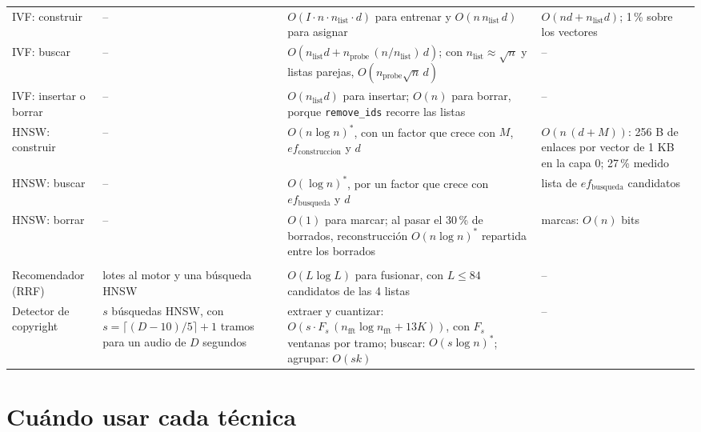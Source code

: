 \documentclass[11pt,a4paper]{article}
\begin{document}
{\begin{longtable}{>{\raggedright\arraybackslash}p{3.1cm}>{\raggedright\arraybackslash}p{4.5cm}>{\raggedright\arraybackslash}p{4.3cm}>{\raggedright\arraybackslash}p{2.9cm}}
IVF: construir & -- & $O(I \cdot n \cdot n_{\text{list}} \cdot d)$ para entrenar y $O(n\, n_{\text{list}}\, d)$ para asignar & $O(n d + n_{\text{list}} d)$; 1\,\% sobre los vectores \\
IVF: buscar & -- & $O(n_{\text{list}} d + n_{\text{probe}}\,(n / n_{\text{list}})\,d)$; con $n_{\text{list}} \approx \sqrt{n}$ y listas parejas, $O(n_{\text{probe}} \sqrt{n}\, d)$ & -- \\
IVF: insertar o borrar & -- & $O(n_{\text{list}} d)$ para insertar; $O(n)$ para borrar, porque \texttt{remove\_ids} recorre las listas & -- \\
HNSW: construir & -- & $O(n \log n)^\ast$, con un factor que crece con $M$, $ef_{\text{construccion}}$ y $d$ & $O(n\,(d + M))$: 256 B de enlaces por vector de 1 KB en la capa 0; 27\,\% medido \\
HNSW: buscar & -- & $O(\log n)^\ast$, por un factor que crece con $ef_{\text{busqueda}}$ y $d$ & lista de $ef_{\text{busqueda}}$ candidatos \\
HNSW: borrar & -- & $O(1)$ para marcar; al pasar el 30\,\% de borrados, reconstrucción $O(n \log n)^\ast$ repartida entre los borrados & marcas: $O(n)$ bits \\
\midrule
\multicolumn{4}{l}{\emph{Parte 5: aplicaciones}} \\
Recomendador (RRF) & 3 lotes al motor y una búsqueda HNSW & $O(L \log L)$ para fusionar, con $L \le 84$ candidatos de las 4 listas & -- \\
Detector de copyright & $s$ búsquedas HNSW, con $s = \lceil (D - 10)/5 \rceil + 1$ tramos para un audio de $D$ segundos & extraer y cuantizar: $O(s \cdot F_s\,(n_{\text{fft}} \log n_{\text{fft}} + 13K))$, con $F_s$ ventanas por tramo; buscar: $O(s \log n)^\ast$; agrupar: $O(s k)$ & -- \\
\end{longtable}
}

\section{Cuándo usar cada técnica}
\end{document}
